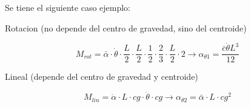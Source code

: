 \documentclass{article}  %
\begin{document}
Se tiene el siguiente caso ejemplo:

Rotacion (no depende del centro de gravedad, sino del centroide)

\begin{equation}
    M_{rot} = \bar{\alpha}\cdot \dot{\theta}\cdot \frac{L}{2}\cdot \frac{L}{2}\cdot \frac{1}{2}\cdot \frac{2}{3}\cdot \frac{L}{2} \cdot 2 \rightarrow \alpha_{\theta 1} = \frac{\bar{c} \dot{\theta} L^3}{12}
\end{equation}

Lineal (depende del centro de gravedad y centroide)

\begin{equation}
    M_{lin} = \dot{\alpha} \cdot L \cdot cg \cdot \dot{\theta} \cdot cg \rightarrow \alpha_{\theta 2} = \bar{\alpha} \cdot L \cdot cg^2
\end{equation}
\end{document}
